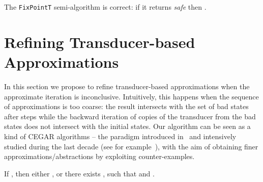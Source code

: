 \documentclass[]{llncs}
\begin{document}
\begin{proposition}\label{prop-FixedPointT}
The {\tt FixPointT} semi-algorithm  is correct: if it returns {\it safe}
then .
\end{proposition}

\section{Refining Transducer-based Approximations}
\label{transducer-based-approximations-CEGAR}

In this section we propose to refine transducer-based approximations when the approximate iteration is inconclusive. 
Intuitively, this happens when the sequence of approximations is too coarse: the result intersects with the set of bad states after  steps while the backward iteration of  copies of the transducer from the bad states does not intersect with the initial states.
Our algorithm can be seen as a kind of CEGAR algorithms -- the paradigm introduced in~\cite{DBLP:conf/cav/ClarkeGJLV00} and intensively studied during the last decade (see for
example~\cite{bouajjani_abstract_2004,DBLP:conf/rta/BoichutCHK08}), with the aim of obtaining finer approximations/abstractions by exploiting counter-examples.


\begin{proposition}\label{prop-raff1}
If , then either , or there exists ,  such that
 and .
\end{proposition}
\end{document}
